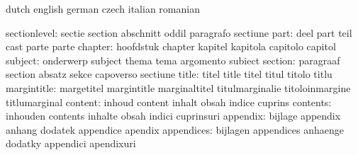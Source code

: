 \stopvariables




\startvariables            dutch                     english
                           german                    czech
                           italian                   romanian

             sectionlevel: sectie                    section
                           abschnitt                 oddil
                           paragrafo                 sectiune
                     part: deel                      part
                           teil                      cast
                           parte                     parte
                  chapter: hoofdstuk                 chapter
                           kapitel                   kapitola
                           capitolo                  capitol
                  subject: onderwerp                 subject
                           thema                     tema
                           argomento                 subiect
                  section: paragraaf                 section
                           absatz                    sekce
                           capoverso                 sectiune
                    title: titel                     title
                           titel                     titul
                           titolo                    titlu
              margintitle: margetitel                margintitle
                           marginaltitel             titulmarginalie
                           titoloinmargine           titlumarginal
                  content: inhoud                    content
                           inhalt                    obsah
                           indice                    cuprins
                 contents: inhouden                  contents
                           inhalte                   obsah
                           indici                    cuprinsuri
                 appendix: bijlage                   appendix
                           anhang                    dodatek
                           appendice                 apendix
               appendices: bijlagen                  appendices
                           anhaenge                  dodatky
                           appendici                 apendixuri
